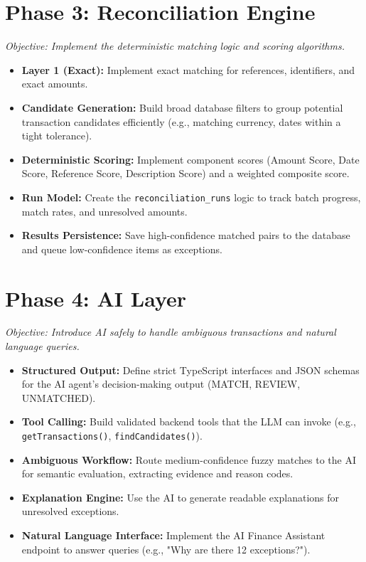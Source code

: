 \documentclass[11pt,a4paper]{article}
\begin{document}
\section{Phase 3: Reconciliation Engine}
\textit{Objective: Implement the deterministic matching logic and scoring algorithms.}
\begin{itemize}[label=$\bullet$, leftmargin=*]
    \item \textbf{Layer 1 (Exact):} Implement exact matching for references, identifiers, and exact amounts.
    \item \textbf{Candidate Generation:} Build broad database filters to group potential transaction candidates efficiently (e.g., matching currency, dates within a tight tolerance).
    \item \textbf{Deterministic Scoring:} Implement component scores (Amount Score, Date Score, Reference Score, Description Score) and a weighted composite score.
    \item \textbf{Run Model:} Create the \texttt{reconciliation\_runs} logic to track batch progress, match rates, and unresolved amounts.
    \item \textbf{Results Persistence:} Save high-confidence matched pairs to the database and queue low-confidence items as exceptions.
\end{itemize}

\section{Phase 4: AI Layer}
\textit{Objective: Introduce AI safely to handle ambiguous transactions and natural language queries.}
\begin{itemize}[label=$\bullet$, leftmargin=*]
    \item \textbf{Structured Output:} Define strict TypeScript interfaces and JSON schemas for the AI agent's decision-making output (MATCH, REVIEW, UNMATCHED).
    \item \textbf{Tool Calling:} Build validated backend tools that the LLM can invoke (e.g., \texttt{getTransactions()}, \texttt{findCandidates()}).
    \item \textbf{Ambiguous Workflow:} Route medium-confidence fuzzy matches to the AI for semantic evaluation, extracting evidence and reason codes.
    \item \textbf{Explanation Engine:} Use the AI to generate readable explanations for unresolved exceptions.
    \item \textbf{Natural Language Interface:} Implement the AI Finance Assistant endpoint to answer queries (e.g., "Why are there 12 exceptions?").
\end{itemize}
\end{document}
